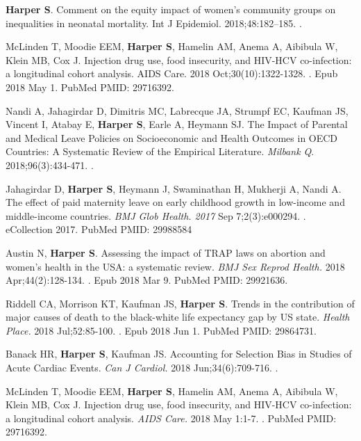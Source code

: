\documentclass[
  letterpaper,
  DIV=11,
  numbers=noendperiod]{scrartcl}
\begin{document}
\begin{etaremune}
\item \textbf{Harper S}. Comment on the equity impact of women's community groups on inequalities in neonatal mortality. Int J Epidemiol. 2018;48:182–185. .

\item McLinden T, Moodie EEM, \textbf{Harper S}, Hamelin AM, Anema A, Aibibula W, Klein MB, Cox J. Injection drug use, food insecurity, and HIV-HCV co-infection: a longitudinal cohort analysis. AIDS Care. 2018 Oct;30(10):1322-1328. . Epub 2018 May 1. PubMed PMID: 29716392.

\item Nandi A, Jahagirdar D, Dimitris MC, Labrecque JA, Strumpf EC, Kaufman JS, Vincent I, Atabay E, \textbf{Harper S}, Earle A, Heymann SJ. The Impact of Parental and Medical Leave Policies on Socioeconomic and Health Outcomes in OECD Countries: A Systematic Review of the Empirical Literature. \emph{Milbank Q}. 2018;96(3):434-471. .

\item Jahagirdar D, \textbf{Harper S}, Heymann J, Swaminathan H, Mukherji A, Nandi A. The effect of paid maternity leave on early childhood growth in low-income and
middle-income countries. \emph{BMJ Glob Health. 2017} Sep 7;2(3):e000294. . eCollection 2017. PubMed PMID: 29988584

\item *Austin N, \textbf{Harper S}. Assessing the impact of TRAP laws on abortion and women's health in the USA: a systematic review. \emph{BMJ Sex Reprod Health.} 2018
Apr;44(2):128-134. . Epub 2018 Mar 9. PubMed PMID: 29921636.

\item *Riddell CA, Morrison KT, Kaufman JS, \textbf{Harper S}. Trends in the contribution of major causes of death to the black-white life expectancy gap by US state. \emph{Health 
Place.} 2018 Jul;52:85-100. . Epub 2018 Jun 1. PubMed PMID: 29864731.

\item Banack HR, \textbf{Harper S}, Kaufman JS. Accounting for Selection Bias in Studies of Acute Cardiac Events. \emph{Can J Cardiol.} 2018 Jun;34(6):709-716. .

\item McLinden T, Moodie EEM, \textbf{Harper S}, Hamelin AM, Anema A, Aibibula W, Klein MB, Cox J. Injection drug use, food insecurity, and HIV-HCV co-infection: a
longitudinal cohort analysis. \emph{AIDS Care.} 2018 May 1:1-7. . PubMed PMID: 29716392.


\end{etaremune}
\end{document}
